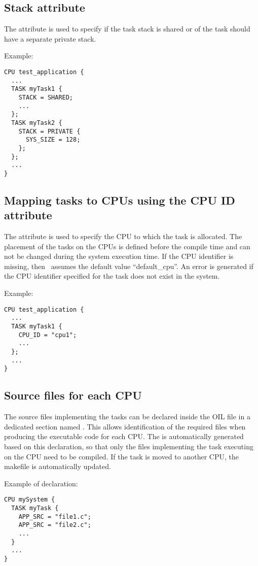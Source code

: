 \subsection{Stack attribute}
The  attribute is used to specify if the task stack is shared or of the task should have a separate private stack.

Example:

\begin{lstlisting}
CPU test_application {
  ...
  TASK myTask1 {
    STACK = SHARED;
    ...
  };
  TASK myTask2 {
    STACK = PRIVATE {
      SYS_SIZE = 128;
    };
  };
  ...
}
\end{lstlisting}

\subsection{Mapping tasks to CPUs using the CPU ID attribute}
\label{sub:task-mapping-to-cpu}

The  attribute is used to specify the CPU
to which the task is allocated. The placement of the tasks on the CPUs
is defined before the compile time and can not be changed during the
system execution time. If the CPU identifier is missing, then \rtd\
assumes the default value ``default\_cpu''. An error is generated if
the CPU identifier specified for the task does not exist in the
system.

Example:

\begin{lstlisting}
CPU test_application {
  ...
  TASK myTask1 {
    CPU_ID = "cpu1";
    ...
  };
  ...
}
\end{lstlisting}



\subsection{Source files for each CPU}
The source files implementing the tasks can be declared inside the OIL
file in a dedicated section named \oiltwo{APP_SRC}{APP_SRCtask}. This allows identification of the
required files when producing the executable code for each CPU. The
\file{makefile} is automatically generated based on this declaration,
so that only the files implementing the task executing on the CPU need
to be compiled. If the task is moved to another CPU, the makefile is
automatically updated.

Example of declaration:

\begin{lstlisting}
CPU mySystem {
  TASK myTask {
    APP_SRC = "file1.c";
    APP_SRC = "file2.c";
    ...
  }
  ...
}
\end{lstlisting}

